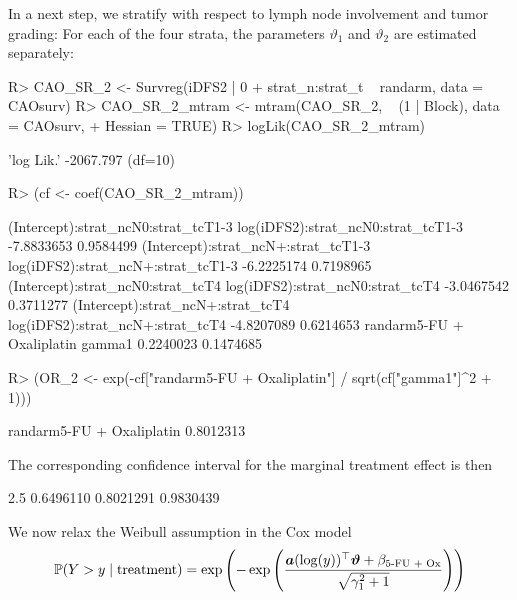 \documentclass[article,nojss,shortnames]{jss}\usepackage[]{graphicx}\usepackage[]{xcolor}
\newcommand{\rY}{Y}
\newcommand{\ry}{y}
\newcommand{\basisy}{\avec}
\newcommand{\parm}{\varthetavec}
\newcommand{\eparm}{\vartheta}
\newcommand{\eshiftparm}{\beta}
\renewcommand{\Prob}{\mathbb{P}}
\def \avec {\text{\boldmath$a$}}    \def \mA {\text{\boldmath$A$}}
\def \varthetavec     {\text{\boldmath$\vartheta$}}
\begin{document}
In a next step, we stratify with respect to lymph node involvement and tumor
grading: For each of the four strata, the parameters $\eparm_1$ and
$\eparm_2$ are estimated separately:
\begin{Schunk}
\begin{Sinput}
R> CAO_SR_2 <- Survreg(iDFS2 | 0 + strat_n:strat_t ~ randarm, data = CAOsurv)
R> CAO_SR_2_mtram <- mtram(CAO_SR_2, ~ (1 | Block), data = CAOsurv,
+                          Hessian  = TRUE)
R> logLik(CAO_SR_2_mtram)
\end{Sinput}
\begin{Soutput}
'log Lik.' -2067.797 (df=10)
\end{Soutput}
\begin{Sinput}
R> (cf <- coef(CAO_SR_2_mtram))
\end{Sinput}
\begin{Soutput}
(Intercept):strat_ncN0:strat_tcT1-3  log(iDFS2):strat_ncN0:strat_tcT1-3 
                         -7.8833653                           0.9584499 
(Intercept):strat_ncN+:strat_tcT1-3  log(iDFS2):strat_ncN+:strat_tcT1-3 
                         -6.2225174                           0.7198965 
  (Intercept):strat_ncN0:strat_tcT4    log(iDFS2):strat_ncN0:strat_tcT4 
                         -3.0467542                           0.3711277 
  (Intercept):strat_ncN+:strat_tcT4    log(iDFS2):strat_ncN+:strat_tcT4 
                         -4.8207089                           0.6214653 
          randarm5-FU + Oxaliplatin                              gamma1 
                          0.2240023                           0.1474685 
\end{Soutput}
\begin{Sinput}
R> (OR_2 <- exp(-cf["randarm5-FU + Oxaliplatin"] / sqrt(cf["gamma1"]^2 + 1)))
\end{Sinput}
\begin{Soutput}
randarm5-FU + Oxaliplatin 
                0.8012313 
\end{Soutput}
\end{Schunk}
The corresponding confidence interval for the marginal treatment effect is
then
\begin{Schunk}
\begin{Soutput}
     2.5%       50%     97.5% 
0.6496110 0.8021291 0.9830439 
\end{Soutput}
\end{Schunk}
We now relax the Weibull assumption in the Cox model
\begin{eqnarray*}
\Prob(\rY > \ry \mid \text{treatment}) = 
\exp\left(-\exp\left(\frac{\basisy(\log(\ry))^\top \parm + 
                     \eshiftparm_\text{5-FU + Ox}}{\sqrt{\gamma_1^2 + 1}}\right)\right)
\end{eqnarray*}
\end{document}
